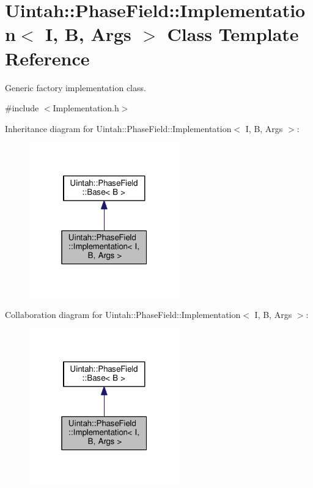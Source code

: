 \hypertarget{classUintah_1_1PhaseField_1_1Implementation}{}\section{Uintah\+:\+:Phase\+Field\+:\+:Implementation$<$ I, B, Args $>$ Class Template Reference}
\label{classUintah_1_1PhaseField_1_1Implementation}


Generic factory implementation class.  




{\ttfamily \#include $<$Implementation.\+h$>$}



Inheritance diagram for Uintah\+:\+:Phase\+Field\+:\+:Implementation$<$ I, B, Args $>$\+:\nopagebreak
\begin{figure}[H]
\begin{center}
\leavevmode
\includegraphics[width=184pt]{classUintah_1_1PhaseField_1_1Implementation__inherit__graph}
\end{center}
\end{figure}


Collaboration diagram for Uintah\+:\+:Phase\+Field\+:\+:Implementation$<$ I, B, Args $>$\+:\nopagebreak
\begin{figure}[H]
\begin{center}
\leavevmode
\includegraphics[width=184pt]{classUintah_1_1PhaseField_1_1Implementation__coll__graph}
\end{center}
\end{figure}
